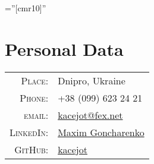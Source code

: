 \documentclass[a4paper,10pt]{article}
\begin{document}
\pagestyle{empty}
\font\fb=''[cmr10]''

\par{\bigskip\par}

\section{Personal Data}

\begin{tabular}{rl}
\textsc{Place:}                     & Dnipro, Ukraine \\
\textsc{Phone:}                     & +38 (099) 623 24 21\\
\textsc{email:}                     & \href{mailto:kacejot@fex.net}{kacejot@fex.net} \\
\textsc{LinkedIn:}                  & \href{https://www.linkedin.com/in/max-goncharenko-342197118/}{Maxim Goncharenko} \\
\textsc{GitHub:}                    & \href{https://github.com/kacejot}{kacejot} \\
\end{tabular}
\end{document}
